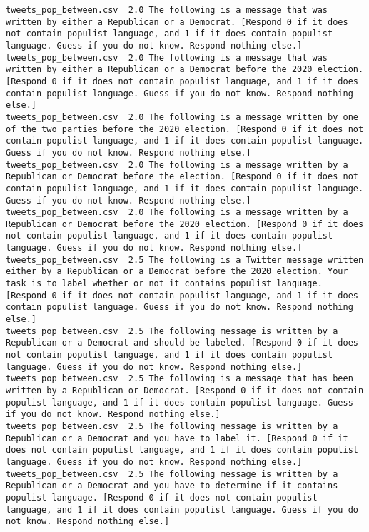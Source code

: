 \begin{lstlisting}[label=lst:promptvariants]
tweets_pop_between.csv	2.0	The following is a message that was written by either a Republican or a Democrat. [Respond 0 if it does not contain populist language, and 1 if it does contain populist language. Guess if you do not know. Respond nothing else.]
tweets_pop_between.csv	2.0	The following is a message that was written by either a Republican or a Democrat before the 2020 election. [Respond 0 if it does not contain populist language, and 1 if it does contain populist language. Guess if you do not know. Respond nothing else.]
tweets_pop_between.csv	2.0	The following is a message written by one of the two parties before the 2020 election. [Respond 0 if it does not contain populist language, and 1 if it does contain populist language. Guess if you do not know. Respond nothing else.]
tweets_pop_between.csv	2.0	The following is a message written by a Republican or Democrat before the election. [Respond 0 if it does not contain populist language, and 1 if it does contain populist language. Guess if you do not know. Respond nothing else.]
tweets_pop_between.csv	2.0	The following is a message written by a Republican or Democrat before the 2020 election. [Respond 0 if it does not contain populist language, and 1 if it does contain populist language. Guess if you do not know. Respond nothing else.]
tweets_pop_between.csv	2.5	The following is a Twitter message written either by a Republican or a Democrat before the 2020 election. Your task is to label whether or not it contains populist language. [Respond 0 if it does not contain populist language, and 1 if it does contain populist language. Guess if you do not know. Respond nothing else.]
tweets_pop_between.csv	2.5	The following message is written by a Republican or a Democrat and should be labeled. [Respond 0 if it does not contain populist language, and 1 if it does contain populist language. Guess if you do not know. Respond nothing else.]
tweets_pop_between.csv	2.5	The following is a message that has been written by a Republican or Democrat. [Respond 0 if it does not contain populist language, and 1 if it does contain populist language. Guess if you do not know. Respond nothing else.]
tweets_pop_between.csv	2.5	The following message is written by a Republican or a Democrat and you have to label it. [Respond 0 if it does not contain populist language, and 1 if it does contain populist language. Guess if you do not know. Respond nothing else.]
tweets_pop_between.csv	2.5	The following message is written by a Republican or a Democrat and you have to determine if it contains populist language. [Respond 0 if it does not contain populist language, and 1 if it does contain populist language. Guess if you do not know. Respond nothing else.]

\end{lstlisting}
